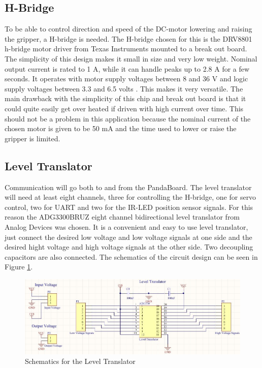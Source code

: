 \subsection{H-Bridge}
To be able to control direction and speed of the DC-motor lowering and raising the gripper, a H-bridge is needed. The H-bridge chosen for this is the DRV8801 h-bridge motor driver from Texas Instruments mounted to a break out board. The simplicity of this design makes it small in size and very low weight. Nominal output current is rated to 1 A, while it can handle peaks up to 2.8 A for a few seconds. It operates with motor supply voltages between 8 and 36 V and logic supply voltages between 3.3 and 6.5 volts \citep{h-bridge}. This makes it very versatile. The main drawback with the simplicity of this chip and break out board is that it could quite easily get over heated if driven with high current over time. This should not be a problem in this application because the nominal current of the chosen motor is given to be 50 mA and the time used to lower or raise the gripper is limited.
\subsection{Level Translator}
\label{level}
Communication will go both to and from the PandaBoard. The level translator will need at least eight channels, three for controlling the H-bridge, one for servo control, two for UART and two for the IR-LED position sensor signals. For this reason the  ADG3300BRUZ eight channel bidirectional level translator from Analog Devices was chosen. It is a convenient and easy to use level translator, just connect the desired low voltage and low voltage signals at one side and the desired hight voltage and high voltage signals at the other side. Two decoupling capacitors are also connected. The schematics of the circuit design can be seen in Figure \ref{levelTranslatorSchematic}.
\begin{figure}[H]
\centering
\includegraphics[width = 15cm]{fig/krets/levelTranslator.jpg}
\caption{Schematics for the Level Translator}
\label{levelTranslatorSchematic}
\end{figure}
